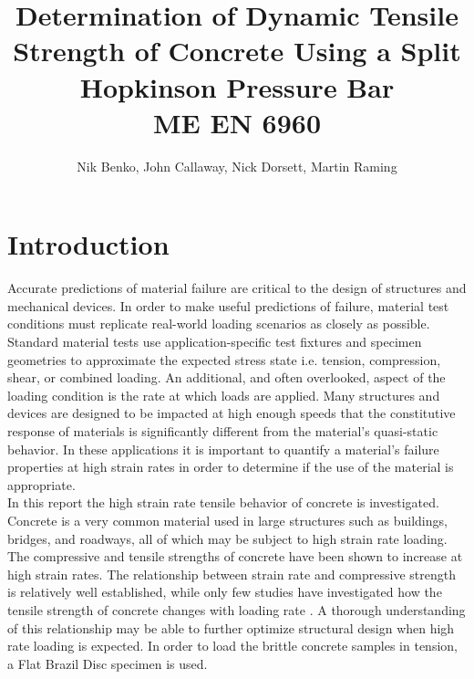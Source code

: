 \documentclass[12pt]{article}
\begin{document}
\title{ Determination of Dynamic Tensile Strength of Concrete Using a Split Hopkinson Pressure Bar  \\ \normalsize{ME EN 6960}}
\author{Nik Benko, John Callaway, Nick Dorsett, Martin Raming}
\maketitle

\begin{abstract} 

\end{abstract}

\section{Introduction} %
Accurate predictions of material failure are critical to the design of structures and mechanical devices. In order to make useful predictions of failure, material test conditions must replicate real-world loading scenarios as closely as possible. Standard material tests use application-specific test fixtures and specimen geometries to approximate the expected stress state i.e. tension, compression, shear, or combined loading. An additional, and often overlooked, aspect of the loading condition is the rate at which loads are applied. Many structures and devices are designed to be impacted at high enough speeds that the constitutive response of materials is significantly different from the material's quasi-static behavior. In these applications it is important to quantify a material's failure properties at high strain rates in order to determine if the use of the material is appropriate.  \\

In this report the high strain rate tensile behavior of concrete is investigated. Concrete is a very common material used in large structures such as buildings, bridges, and roadways, all of which may be subject to high strain rate loading. The compressive and tensile strengths of concrete have been shown to increase at high strain rates. The relationship between strain rate and compressive strength is relatively well established, while only few studies have investigated how the tensile strength of concrete changes with loading rate \cite{Jin2017}. A thorough understanding of this relationship may be able to further optimize structural design when high rate loading is expected. In order to load the brittle concrete samples in tension, a Flat Brazil Disc specimen is used.\\ 
\end{document}
